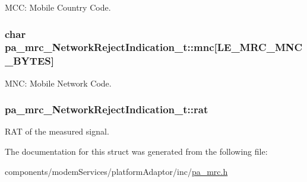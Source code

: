 M\+CC\+: Mobile Country Code. 

\subsubsection[{\texorpdfstring{mnc}{mnc}}]{\setlength{\rightskip}{0pt plus 5cm}char pa\+\_\+mrc\+\_\+\+Network\+Reject\+Indication\+\_\+t\+::mnc\mbox{[}{\bf L\+E\+\_\+\+M\+R\+C\+\_\+\+M\+N\+C\+\_\+\+B\+Y\+T\+ES}\mbox{]}}\hypertarget{structpa__mrc___network_reject_indication__t_a2bd2cf6eadfd133be0eb01974c6b75aa}{}\label{structpa__mrc___network_reject_indication__t_a2bd2cf6eadfd133be0eb01974c6b75aa}


M\+NC\+: Mobile Network Code. 

\subsubsection[{\texorpdfstring{rat}{rat}}]{ pa\+\_\+mrc\+\_\+\+Network\+Reject\+Indication\+\_\+t\+::rat}\hypertarget{structpa__mrc___network_reject_indication__t_ab1d5415b92d2a3cb7df31eaf5def6c14}{}\label{structpa__mrc___network_reject_indication__t_ab1d5415b92d2a3cb7df31eaf5def6c14}


R\+AT of the measured signal. 



The documentation for this struct was generated from the following file\+:\begin{DoxyCompactItemize}
\item 
components/modem\+Services/platform\+Adaptor/inc/\hyperlink{pa__mrc_8h}{pa\+\_\+mrc.\+h}\end{DoxyCompactItemize}
